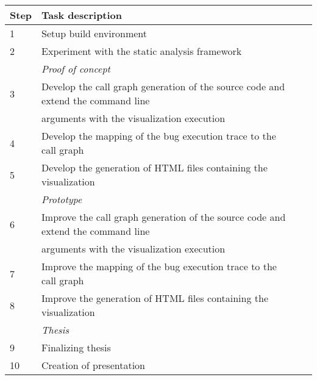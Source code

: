 \begin{tabular}{ | l | l | l | l |}
\hline
\textbf{Step} & \textbf{Task description} \\ 
\hline
1 & Setup build environment \\
\hline
2 & Experiment with the static analysis framework \\ 
\hline
& \textit{Proof of concept} \\ 
\hline
3 & Develop the call graph generation of the source code and extend the command line \\ 
   & arguments with the visualization execution \\ 
\hline
4 & Develop the mapping of the bug execution trace to the call graph \\ 
\hline
5 & Develop the generation of HTML files containing the visualization \\ 
\hline
& \textit{Prototype} \\ 
\hline
6 & Improve the call graph generation of the source code and extend the command line \\ 
   & arguments with the visualization execution \\ 
\hline
7 & Improve the mapping of the bug execution trace to the call graph \\ 
\hline
8 & Improve the generation of HTML files containing the visualization \\ 
\hline
& \textit{Thesis} \\ 
\hline
9 & Finalizing thesis \\
\hline
10 & Creation of presentation \\ 
\hline


\end{tabular}
